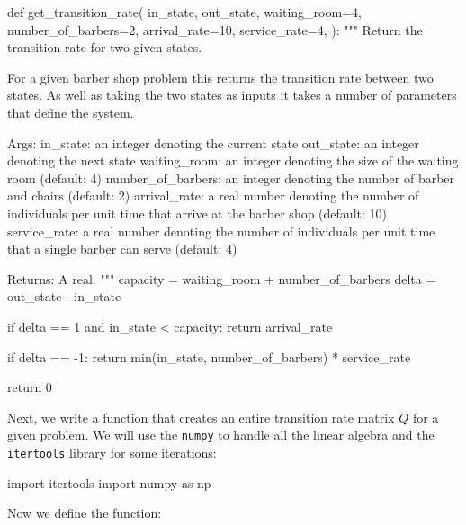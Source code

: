 \begin{pyin}
def get_transition_rate(
    in_state,
    out_state,
    waiting_room=4,
    number_of_barbers=2,
    arrival_rate=10,
    service_rate=4,
):
    """
    Return the transition rate for two given states.

    For a given barber shop problem this returns the transition rate between two
    states. As well as taking the two states as inputs it takes a number of
    parameters that define the system.

    Args:
        in_state: an integer denoting the current state
        out_state: an integer denoting the next state
        waiting_room: an integer denoting the size of the waiting room (default: 4)
        number_of_barbers: an integer denoting the number of barber and chairs (default: 2)
        arrival_rate: a real number denoting the number of individuals per unit time
                      that arrive at the barber shop (default: 10)
        service_rate: a real number denoting the number of individuals per unit time
                      that a single barber can serve (default: 4)

    Returns:
        A real.
    """
    capacity = waiting_room + number_of_barbers
    delta = out_state - in_state

    if delta == 1 and in_state < capacity:
        return arrival_rate

    if delta == -1:
        return min(in_state, number_of_barbers) * service_rate

    return 0
\end{pyin}

Next, we write a function that creates an entire transition rate matrix \(Q\)
for a given problem. We will use the \texttt{numpy} to handle all
the linear algebra and the \texttt{itertools} library for some
iterations:

\begin{pyin}
import itertools
import numpy as np
\end{pyin}

Now we define the function:

